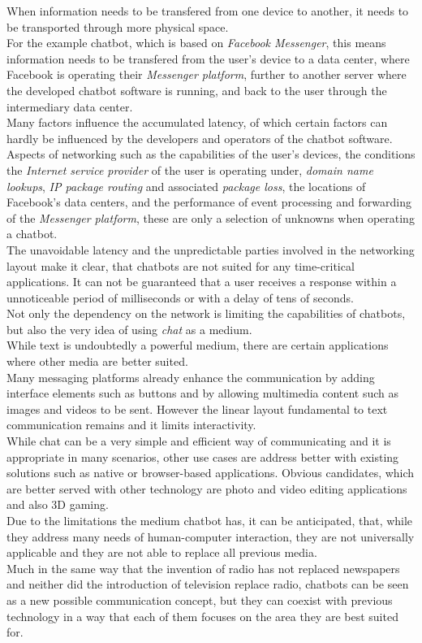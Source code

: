 When information needs to be transfered from one device to another,
it needs to be transported through more physical space.
\\
For the example chatbot, which is based on \emph{Facebook Messenger},
this means information needs to be transfered from the user's device to a data center,
where Facebook is operating their \emph{Messenger platform},
further to another server where the developed chatbot software is running,
and back to the user through the intermediary data center.
\\
Many factors influence the accumulated latency,
of which certain factors can hardly be influenced by the developers and operators of the chatbot software.
\\
Aspects of networking such as the capabilities of the user's devices,
the conditions the \emph{Internet service provider} of the user is operating under,
\emph{domain name lookups},
\emph{IP package routing} and associated \emph{package loss},
the locations of Facebook's data centers,
and the performance of event processing and forwarding of the \emph{Messenger platform},
these are only a selection of unknowns when operating a chatbot.
\\
The unavoidable latency and the unpredictable parties involved in the networking layout
make it clear, that chatbots are not suited for any time-critical applications.
It can not be guaranteed that a user receives a response within a unnoticeable period of milliseconds or with a delay of tens of seconds.
\\

Not only the dependency on the network is limiting the capabilities of chatbots,
but also the very idea of using \emph{chat} as a medium.
\\
While text is undoubtedly a powerful medium,
there are certain applications where other media are better suited.
\\
Many messaging platforms already enhance the communication by adding interface elements such as buttons
and by allowing multimedia content such as images and videos to be sent.
However the linear layout fundamental to text communication remains and it limits interactivity.
\\
While chat can be a very simple and efficient way of communicating and it is appropriate in many scenarios,
other use cases are address better with existing solutions such as native or browser-based applications.
Obvious candidates, which are better served with other technology are photo and video editing applications
and also 3D gaming.
\\

Due to the limitations the medium chatbot has, it can be anticipated,
that, while they address many needs of human-computer interaction,
they are not universally applicable and they are not able to replace all previous media.
\\

Much in the same way that the invention of radio has not replaced newspapers
and neither did the introduction of television replace radio,
chatbots can be seen as a new possible communication concept,
but they can coexist with previous technology in a way that each of them focuses on the area they are best suited for.
